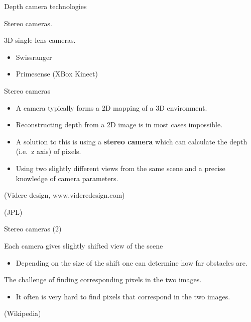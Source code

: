 \documentclass[compress]{beamer}
\begin{document}
\begin{frame}{Depth camera technologies}

Stereo cameras.

3D single lens cameras.

\begin{itemize}

\item
  Swissranger
\item
  Primesense (XBox Kinect)
\end{itemize}

\end{frame}

\begin{frame}{Stereo cameras}

\begin{itemize}

\item
  A camera typically forms a 2D mapping of a 3D environment.
\item
  Reconstructing depth from a 2D image is in most cases impossible.
\item
  A solution to this is using a \textbf{stereo camera} which can
  calculate the depth (i.e.~z axis) of pixels.
\item
  Using two slightly different views from the same scene and a precise
  knowledge of camera parameters.
\end{itemize}

(Videre design, www.videredesign.com)

(JPL)

\end{frame}

\begin{frame}{Stereo cameras (2)}

Each camera gives slightly shifted view of the scene

\begin{itemize}

\item
  Depending on the size of the shift one can determine how far obstacles
  are.
\end{itemize}

The challenge of finding corresponding pixels in the two images.

\begin{itemize}

\item
  It often is very hard to find pixels that correspond in the two
  images.
\end{itemize}

(Wikipedia)

\end{frame}
\end{document}

